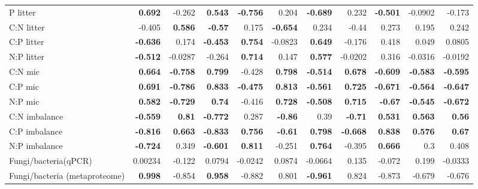 \documentclass[10pt]{article}
\begin{document}
\begin{flushleft}
\begin{landscape}
\begin{table}[h!]
{\begin{tabular}{lrrrrrrrrrr}
  P litter & \textbf{ 0.692 } & -0.262 & \textbf{ 0.543 } & \textbf{ -0.756 } & 0.204 & \textbf{ -0.689 } & 0.232 & \textbf{ -0.501 } & -0.0902 & -0.173 \\ 
  C:N litter & -0.405 & \textbf{ 0.586 } & \textbf{ -0.57 } & 0.175 & \textbf{ -0.654 } & 0.234 & -0.44 & 0.273 & 0.195 & 0.242 \\ 
  C:P litter & \textbf{ -0.636 } & 0.174 & \textbf{ -0.453 } & \textbf{ 0.754 } & -0.0823 & \textbf{ 0.649 } & -0.176 & 0.418 & 0.049 & 0.0805 \\ 
  N:P litter & \textbf{ -0.512 } & -0.0287 & -0.264 & \textbf{ 0.714 } & 0.147 & \textbf{ 0.577 } & -0.0202 & 0.316 & -0.0316 & -0.0192 \\ 
  C:N mic & \textbf{ 0.664 } & \textbf{ -0.758 } & \textbf{ 0.799 } & -0.428 & \textbf{ 0.798 } & \textbf{ -0.514 } & \textbf{ 0.678 } & \textbf{ -0.609 } & \textbf{ -0.583 } & \textbf{ -0.595 } \\ 
  C:P mic & \textbf{ 0.691 } & \textbf{ -0.786 } & \textbf{ 0.833 } & \textbf{ -0.475 } & \textbf{ 0.813 } & \textbf{ -0.561 } & \textbf{ 0.725 } & \textbf{ -0.671 } & \textbf{ -0.564 } & \textbf{ -0.647 } \\ 
  N:P mic & \textbf{ 0.582 } & \textbf{ -0.729 } & \textbf{ 0.74 } & -0.416 & \textbf{ 0.728 } & \textbf{ -0.508 } & \textbf{ 0.715 } & \textbf{ -0.67 } & \textbf{ -0.545 } & \textbf{ -0.672 } \\ 
  C:N imbalance & \textbf{ -0.559 } & \textbf{ 0.81 } & \textbf{ -0.772 } & 0.287 & \textbf{ -0.86 } & 0.39 & \textbf{ -0.71 } & \textbf{ 0.531 } & \textbf{ 0.563 } & \textbf{ 0.56 } \\ 
  C:P imbalance & \textbf{ -0.816 } & \textbf{ 0.663 } & \textbf{ -0.833 } & \textbf{ 0.756 } & \textbf{ -0.61 } & \textbf{ 0.798 } & \textbf{ -0.668 } & \textbf{ 0.838 } & \textbf{ 0.576 } & \textbf{ 0.67 } \\ 
  N:P imbalance & \textbf{ -0.724 } & 0.349 & \textbf{ -0.601 } & \textbf{ 0.811 } & -0.251 & \textbf{ 0.764 } & -0.395 & \textbf{ 0.666 } &  0.3 & 0.408 \\ 
  Fungi/bacteria(qPCR) & 0.00234 & -0.122 & 0.0794 & -0.0242 & 0.0874 & -0.0664 & 0.135 & -0.072 & 0.199 & -0.0333 \\ 
  Fungi/bacteria (metaproteome) & \textbf{ 0.998 } & -0.854 & \textbf{ 0.958 } & -0.882 & 0.801 & \textbf{ -0.961 } & 0.824 & -0.873 & -0.679 & -0.676 \\ 
   \hline
\end{tabular}
}
\end{table}

\end{landscape}
\end{flushleft}
\end{document}
